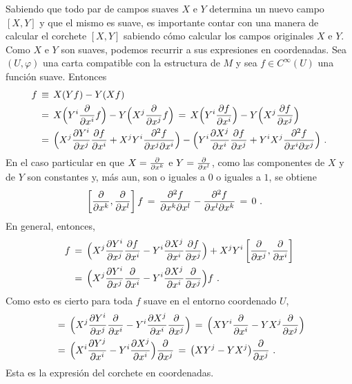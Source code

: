 \begin{obsCorcheteEnCoords}\label{obs:corcheteencoords}
	Sabiendo que todo par de campos suaves $X$ e $Y$ determina un nuevo
	campo $[X,Y]$ y que el mismo es suave, es importante contar con una
	manera de calcular el corchete $[X,Y]$ sabiendo c\'{o}mo calcular los
	campos originales $X$ e $Y$. Como $X$ e $Y$ son suaves, podemos
	recurrir a sus expresiones en coordenadas. Sea $(U,\varphi)$ una
	carta compatible con la estructura de $M$ y sea $f\in C^{\infty}(U)$
	una funci\'{o}n suave. Entonces
	\begin{align*}
		[X,Y]f & \,\equiv\,X(Yf)-Y(Xf) \\
		& \,=\,	X\Big(Y^{i}\gancho{x^{i}}f\Big)-
			Y\Big(X^{j}\gancho{x^{j}}f\Big)
		\,=\,X\Big(Y^{i}\derivada{f}{x^{i}}\Big)-
			Y\Big(X^{j}\derivada{f}{x^{j}}\Big) \\
		& \,=\,\Big(X^{j}\derivada{Y^{i}}{x^{j}}\derivada{f}{x^{i}}+
			X^{j}Y^{i}
			\frac{\partial^{2} f}{\partial x^{j}\partial x^{i}}
			\Big) - \Big(
			Y^{i}\derivada{X^{j}}{x^{i}}\derivada{f}{x^{j}}+
			Y^{i}X^{j}
			\frac{\partial^{2} f}{\partial x^{i}\partial x^{j}}
			\Big)
		\text{ .}
	\end{align*}
	En el caso particular en que $X=\gancho{x^{k}}$ e $Y=\gancho{x^{l}}$,
	como las componentes de $X$ y de $Y$ son constantes y, m\'{a}s aun,
	son o iguales a $0$ o iguales a $1$, se obtiene
	\begin{align*}
		\left[\gancho{x^{k}},\gancho{x^{l}}\right]f & \,=\,
			\frac{\partial^{2} f}{\partial x^{k}\partial x^{l}}-
			\frac{\partial^{2} f}{\partial x^{l}\partial x^{k}}
		\,=\, 0\text{ .}
	\end{align*}
	En general, entonces,
	\begin{align*}
		[X,Y]f & \,=\,\Big(
			X^{j}\derivada{Y^{i}}{x^{j}}\derivada{f}{x^{i}} -
			Y^{i}\derivada{X^{j}}{x^{i}}\derivada{f}{x^{j}}\Big)
			+X^{j}Y^{i}\left[\gancho{x^{j}},\gancho{x^{i}}\right]
			\\
		& \,=\,\Big(X^{j}\derivada{Y^{i}}{x^{j}}\gancho{x^{i}}-
			Y^{i}\derivada{X^{j}}{x^{i}}\gancho{x^{j}}\Big) f
		\text{ .}
	\end{align*}
	Como esto es cierto para toda $f$ suave en el entorno coordenado $U$,
	\begin{align*}
		[X,Y] & \,=\,\Big(X^{j}\derivada{Y^{i}}{x^{j}}\gancho{x^{i}}-
			Y^{i}\derivada{X^{j}}{x^{i}}\gancho{x^{j}}\Big) \,=\,
			\Big(XY^{i}\gancho{x^{i}}-YX^{j}\gancho{x^{j}}\Big) \\
		& \,=\, \Big(X^{i}\derivada{Y^{j}}{x^{i}}-
				Y^{i}\derivada{X^{j}}{x^{i}}\Big)
			\gancho{x^{j}} \,=\,
			\big(XY^{j}-YX^{j}\big)\gancho{x^{j}}
		\text{ .}
	\end{align*}
	Esta es la expresi\'{o}n del corchete en coordenadas.
\end{obsCorcheteEnCoords}

